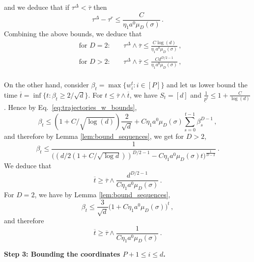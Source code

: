 \documentclass[11pt]{article}
\newcommand{\<}{\langle}
\renewcommand{\>}{\rangle}
\theoremstyle{definition}
\def\up{\underline{p}}
\def\otau{\overline{\tau}}
\def\ot{\overline{t}}
\begin{document}
and we deduce that if $\tau^{\Delta} < \otau$ then
\begin{equation*}
\tau^{\Delta} - \tau^r \leq \frac{C}{\eta_1 a^0 \mu_D (\sigma)}\,  .
\end{equation*}
Combining the above bounds, we deduce that
\begin{equation}\label{eq:cond_T_1}
    \begin{aligned}
    &\text{for $D = 2$:} \qquad \tau^\Delta \wedge \otau \leq \frac{C \log (d) }{\eta_1 a^0 \mu_D  (\sigma)} \, , \\
    &\text{for $D > 2$:} \qquad \tau^\Delta \wedge \otau \leq \frac{C d^{D/2 -1} }{\eta_1 a^0 \mu_D  (\sigma)} \, , \\
    \end{aligned}
\end{equation}

On the other hand, consider $\beta_t = \max \{ w_i^t : i \in [P] \}$ and let us lower bound the time $\ot = \inf \{ t : \beta_{t} \geq 2/\sqrt{d} \}$. For $t \leq \otau \wedge \ot $, we have $S_t = [d]$ and $\frac{1}{\up^t} \leq 1 + \frac{C}{\log(d)}$. Hence by Eq.~\eqref{eq:trajectories_w_bounds},
\[
\beta_t \leq (1 + C/\sqrt{\log(d)} ) \frac{2}{\sqrt{d}} + C \eta_1 a^0 \mu_D (\sigma) \sum_{s = 0}^{t-1} \beta_s^{D-1}\, ,
\]
and therefore by Lemma \ref{lem:bound_sequences}, we get for $D>2$,
\begin{equation}\label{eq:bound_beta_D}
\beta_t \leq \frac{1}{\big( (d/2(1+C/\sqrt{\log d}))^{D/2-1} - C \eta_1 a^0 \mu_D (\sigma) t \Big)^{ \frac{1}{D-2}}}\, .
\end{equation}
We deduce that
\begin{equation}\label{eq:lower_bound_beta_1}
 \ot \geq \otau \wedge \frac{ d^{D/2 -1}}{C\eta_1 a^0 \mu_D (\sigma)} \, .
\end{equation}
For $D =2$, we have by Lemma \ref{lem:bound_sequences},
\begin{equation}\label{eq:bound_beta_D2}
\beta_t \leq \frac{3}{\sqrt{d}} \big(1 + C \eta_1 a^0 \mu_D(\sigma) \big)^t\, ,
\end{equation}
and therefore 
\begin{equation}\label{eq:lower_bound_beta_2}
 \ot \geq \otau \wedge \frac{ 1 }{C\eta_1 a^0 \mu_D (\sigma)} \, .
\end{equation}

\noindent
\textbf{Step 3: Bounding the coordinates $P+1 \leq i \leq d$.}
\end{document}

